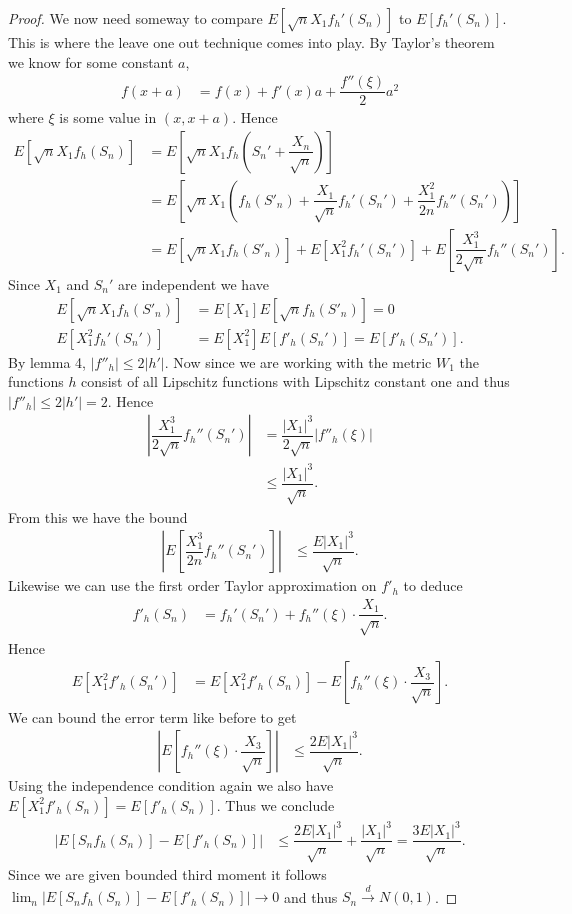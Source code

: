 \documentclass[11pt]{article}
\newcommand{\ind}{\overset{d}{\to}}
\begin{document}
\begin{flushleft}
\begin{proof}
We now need someway to compare $E[\sqrt{n} X_1 f_h'(S_n)]$ to $E[f_h'(S_n)]$. This is where the leave one out technique comes into play. By Taylor's theorem
we know for some constant $a$,
\begin{align*}
f(x+a) &= f(x) + f'(x)a + \dfrac{f''(\xi)}{2}a^2
\end{align*}
where $\xi$ is some value in $(x,x+a)$. Hence
\begin{align*}
E[\sqrt{n} X_1 f_h(S_n)] &= E\left[\sqrt{n} X_1 f_h \left(S_n' + \dfrac{X_n}{\sqrt{n}} \right) \right]\\
&=E\left[\sqrt{n} X_1 \left(f_h(S'_n) + \dfrac{X_1}{\sqrt{n}}f_h'(S_n') + \dfrac{X_1^2}{2n}f_h''(S_n')\right) \right]\\
&=E[\sqrt{n}X_1f_h(S'_n)] + E[X_1^2f_h'(S_n')] + E\left[ \dfrac{X_1^3}{2\sqrt{n}} f_h''(S_n') \right].
\end{align*}
Since $X_1$ and $S_n'$ are independent we have
\begin{align*}
E[\sqrt{n}X_1f_h(S'_n)] &= E[X_1]E[\sqrt{n}f_h(S'_n)] =  0\\
E[X_1^2f_h'(S_n')]&= E[X_1^2]E[f'_h(S_n')] = E[f'_h(S_n')].
\end{align*}
By lemma 4,  $|f''_h| \leq 2 |h'|$. Now since we are working with the metric $W_1$ the functions $h$ consist of all 
Lipschitz functions with Lipschitz constant one and thus $|f''_h| \leq 2|h'| = 2$. Hence
\begin{align*}
\left| \dfrac{X_1^3}{2\sqrt{n}} f_h''(S_n') \right| &= \dfrac{|X_1|^3}{2\sqrt{n}} |f''_h(\xi)|\\
&\leq \dfrac{|X_1|^3}{\sqrt{n}}.
\end{align*}
From this we have the bound
\begin{align*}
 \left|  E\left[ \dfrac{X_1^3}{2n} f_h''(S_n') \right] \right| &\leq \dfrac{E|X_1|^3}{\sqrt{n}}.
\end{align*}
Likewise we can use the first order Taylor approximation on $f'_h$ to deduce
\begin{align*}
f'_h(S_n) &= f_h'(S_n') + f_h''(\xi) \cdot \dfrac{X_1}{\sqrt{n}}.
\end{align*}
Hence
\begin{align*}
E[X_1^2 f'_h(S_n')] &=  E[X_1^2 f'_h(S_n)] - E \left[f_h''(\xi) \cdot \dfrac{X_3}{\sqrt{n}} \right].
\end{align*}
We can bound the error term like before to get
\begin{align*}
\left| E \left[f_h''(\xi) \cdot \dfrac{X_3}{\sqrt{n}} \right] \right| &\leq  \dfrac{2E|X_1|^3}{\sqrt{n}}.
\end{align*}
Using the independence condition again we also have $E[X_1^2 f'_h(S_n)] = E[f'_h(S_n)]$. Thus we conclude
\begin{align*}
|E[S_nf_h(S_n)] - E[f'_h(S_n)] | &\leq   \dfrac{2E|X_1|^3}{\sqrt{n}} + \dfrac{|X_1|^3}{\sqrt{n}} =  \dfrac{3E|X_1|^3}{\sqrt{n}}.
\end{align*}
Since we are given bounded third moment it follows $\lim_n |E[S_nf_h(S_n)] - E[f'_h(S_n)] | \to 0$ and thus $S_n \ind N(0,1)$.
\end{proof}


\end{flushleft}
\end{document}
